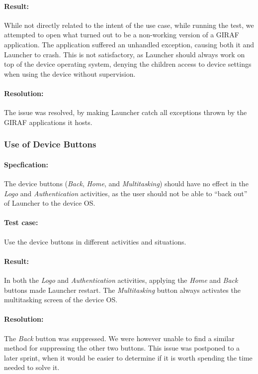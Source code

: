\paragraph{Result:} While not directly related to the intent of the use case, while running the test, we attempted to open what turned out to be a non-working version of a GIRAF application. The application suffered an unhandled exception, causing both it and Launcher to crash. This is not satisfactory, as Launcher should always work on top of the device operating system, denying the children access to device settings when using the device without supervision.
\paragraph{Resolution:} The issue was resolved, by making Launcher catch all exceptions thrown by the GIRAF applications it hosts.


\subsubsection{Use of Device Buttons}

\paragraph{Specfication:} The device buttons (\textit{Back}, \textit{Home}, and \textit{Multitasking}) should have no effect in the \textit{Logo} and \textit{Authentication} activities, as the user should not be able to ``back out'' of Launcher to the device OS.
\paragraph{Test case:} Use the device buttons in different activities and situations.
\paragraph{Result:} In both the \textit{Logo} and \textit{Authentication} activities, applying the \textit{Home} and \textit{Back} buttons made Launcher restart. The \textit{Multitasking} button always activates the multitasking screen of the device OS.
\paragraph{Resolution:} The \textit{Back} button was suppressed. We were however unable to find a similar method for suppressing the other two buttons. This issue was postponed to a later sprint, when it would be easier to determine if it is worth spending the time needed to solve it.